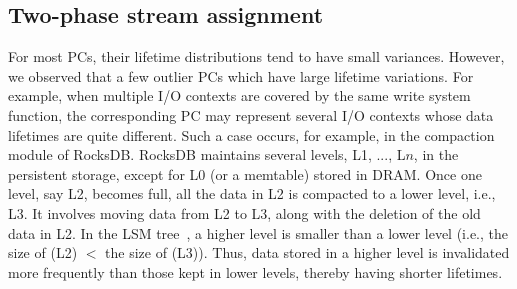 \vspace{-10pt}
\subsection{Two-phase stream assignment}
\vspace{-5pt}

For most PCs, their lifetime distributions tend to have small variances.  
However, we observed that a few outlier PCs which have large lifetime variations. 
For example, when multiple I/O contexts are covered by the same write system function, 
the corresponding PC may represent several I/O contexts whose data lifetimes are quite different.   
Such a case occurs, for example, in the compaction module of RocksDB.
RocksDB maintains
several levels, L1, ..., L$n$, in the persistent storage, except for L0 (or a
memtable) stored in DRAM.  Once one level, say L2, becomes full, all the data
in L2 is compacted to a lower level, i.e., L3.  It involves moving data from L2
to L3, along with the deletion of the old data in L2.  In the
LSM tree~\cite{LSM}, a higher level is smaller than a lower level 
(i.e., the size of (L2) $<$ the size of (L3)). 
Thus, data stored in a higher level is invalidated more frequently than those kept
in lower levels, thereby having shorter lifetimes.



